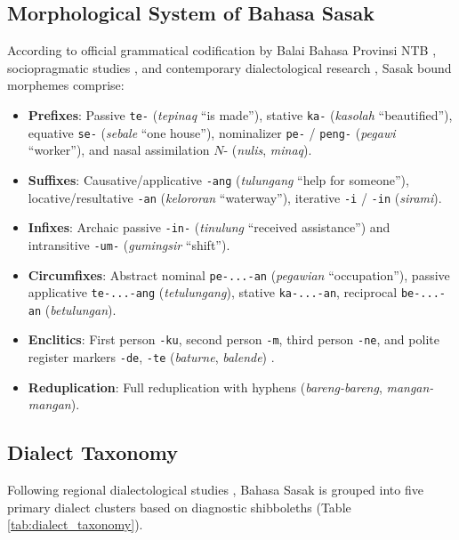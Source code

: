 \documentclass[journal,10pt]{IEEEtran}
\begin{document}
\subsection{Morphological System of Bahasa Sasak}
According to official grammatical codification by Balai Bahasa Provinsi NTB \cite{balaibahasa2022}, sociopragmatic studies \cite{yaqin2022}, and contemporary dialectological research \cite{hakim2023, hakim2022}, Sasak bound morphemes comprise:
\begin{itemize}
    \item \textbf{Prefixes}: Passive \texttt{te-} (\textit{tepinaq} ``is made''), stative \texttt{ka-} (\textit{kasolah} ``beautified''), equative \texttt{se-} (\textit{sebale} ``one house''), nominalizer \texttt{pe-} / \texttt{peng-} (\textit{pegawi} ``worker''), and nasal assimilation $N$- (\textit{nulis}, \textit{minaq}).
    \item \textbf{Suffixes}: Causative/applicative \texttt{-ang} (\textit{tulungang} ``help for someone''), locative/resultative \texttt{-an} (\textit{kelororan} ``waterway''), iterative \texttt{-i} / \texttt{-in} (\textit{sirami}).
    \item \textbf{Infixes}: Archaic passive \texttt{-in-} (\textit{tinulung} ``received assistance'') and intransitive \texttt{-um-} (\textit{gumingsir} ``shift'').
    \item \textbf{Circumfixes}: Abstract nominal \texttt{pe-...-an} (\textit{pegawian} ``occupation''), passive applicative \texttt{te-...-ang} (\textit{tetulungang}), stative \texttt{ka-...-an}, reciprocal \texttt{be-...-an} (\textit{betulungan}).
    \item \textbf{Enclitics}: First person \texttt{-ku}, second person \texttt{-m}, third person \texttt{-ne}, and polite register markers \texttt{-de}, \texttt{-te} (\textit{baturne}, \textit{balende}) \cite{yaqin2022}.
    \item \textbf{Reduplication}: Full reduplication with hyphens (\textit{bareng-bareng}, \textit{mangan-mangan}).
\end{itemize}

\subsection{Dialect Taxonomy}
Following regional dialectological studies \cite{hakim2023, balaibahasa2022, hakim2022}, Bahasa Sasak is grouped into five primary dialect clusters based on diagnostic shibboleths (Table \ref{tab:dialect_taxonomy}).
\end{document}
